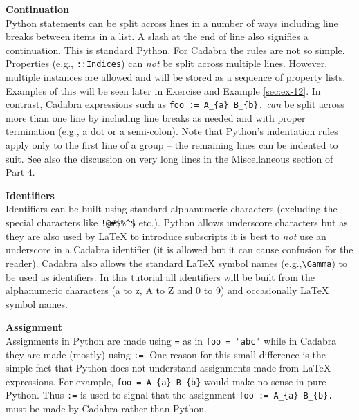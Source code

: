 \documentclass[a4paper,12pt]{article}
\numberwithin{equation}{section}%
\begin{document}
{\bf Continuation}\\[5pt]
Python statements can be split across lines in a number of ways including line breaks
between items in a list. A slash at the end of line also signifies a continuation. This is
standard Python. For Cadabra the rules are not so simple. Properties (e.g.,
\verb|::Indices|) can \emph{not} be split across multiple lines. However, multiple instances
are allowed and will be stored as a sequence of property lists. Examples of this will be
seen later in Exercise  and Example \ref{sec:ex-12}. In contrast, Cadabra
expressions such as \verb|foo := A_{a} B_{b}.| \emph{can} be split across more than one line
by including line breaks as needed and with proper termination (e.g., a dot or a
semi-colon). Note that Python's indentation rules apply only to the first line of a group --
the remaining lines can be indented to suit. See also the discussion on very long lines in
the Miscellaneous section of Part 4.

{\bf Identifiers}\\[5pt]
Identifiers can be built using standard alphanumeric characters (excluding the special
characters like \verb|!@#$%^$| etc.). Python allows underscore characters but as they are
also used by LaTeX to introduce subscripts it is best to \emph{not} use an underscore in a
Cadabra identifier (it is allowed but it can cause confusion for the reader). Cadabra also
allows the standard LaTeX symbol names (e.g.,\verb|\Gamma|) to be used as identifiers. In
this tutorial all identifiers will be built from the alphanumeric characters (a to z, A to Z
and 0 to 9) and occasionally LaTeX symbol names.

{\bf Assignment}\\[5pt]
Assignments in Python are made using \verb|=| as in \verb|foo = "abc"| while in Cadabra they
are made (mostly) using \verb|:=|. One reason for this small difference is the simple fact
that Python does not understand assignments made from LaTeX expressions. For example,
\verb|foo = A_{a} B_{b}| would make no sense in pure Python. Thus \verb|:=| is used to
signal that the assignment \verb|foo := A_{a} B_{b}.| must be made by Cadabra rather than
Python.
\end{document}
